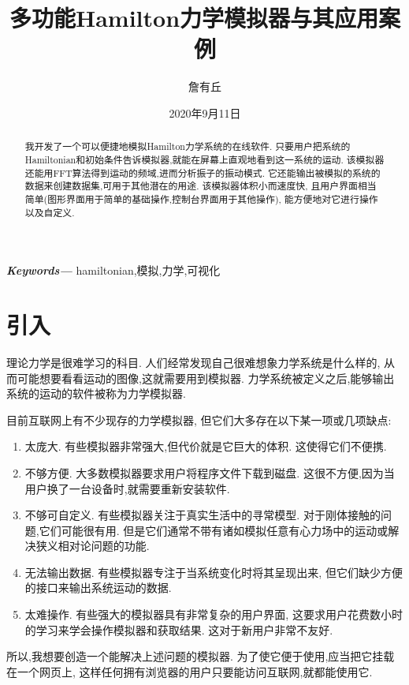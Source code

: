 \documentclass[12pt]{article}
\date{2020年9月11日}
\title{多功能Hamilton力学模拟器与其应用案例}
\author{詹有丘}
\providecommand{\keywords}[1]{\small\textbf{\textit{Keywords---}} #1}
\begin{document}
\maketitle

\begin{abstract}
我开发了一个可以便捷地模拟Hamilton力学系统的在线软件.
只要用户把系统的Hamiltonian和初始条件告诉模拟器,就能在屏幕上直观地看到这一系统的运动.
该模拟器还能用FFT算法得到运动的频域,进而分析振子的振动模式.
它还能输出被模拟的系统的数据来创建数据集,可用于其他潜在的用途.
该模拟器体积小而速度快,
且用户界面相当简单(图形界面用于简单的基础操作,控制台界面用于其他操作),
能方便地对它进行操作以及自定义.
\end{abstract}

\keywords{hamiltonian,模拟,力学,可视化}

\tableofcontents

\section{引入}
\label{sec:intro}

理论力学是很难学习的科目.
人们经常发现自己很难想象力学系统是什么样的,
从而可能想要看看运动的图像,这就需要用到模拟器.
力学系统被定义之后,能够输出系统的运动的软件被称为力学模拟器.

目前互联网上有不少现存的力学模拟器,
但它们大多存在以下某一项或几项缺点:
\begin{enumerate}
  \item 太庞大.
  有些模拟器非常强大,但代价就是它巨大的体积.
  这使得它们不便携.

  \item 不够方便.
  大多数模拟器要求用户将程序文件下载到磁盘.
  这很不方便,因为当用户换了一台设备时,就需要重新安装软件.

  \item 不够可自定义.
  有些模拟器关注于真实生活中的寻常模型.
  对于刚体接触的问题,它们可能很有用.
  但是它们通常不带有诸如模拟任意有心力场中的运动或解决狭义相对论问题的功能.

  \item 无法输出数据.
  有些模拟器专注于当系统变化时将其呈现出来,
  但它们缺少方便的接口来输出系统运动的数据.

  \item 太难操作.
  有些强大的模拟器具有非常复杂的用户界面,
  这要求用户花费数小时的学习来学会操作模拟器和获取结果.
  这对于新用户非常不友好.
\end{enumerate}

所以,我想要创造一个能解决上述问题的模拟器.
为了使它便于使用,应当把它挂载在一个网页上,
这样任何拥有浏览器的用户只要能访问互联网,就都能使用它.
\end{document}
